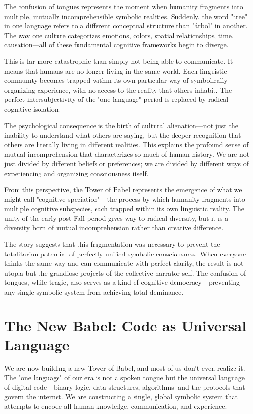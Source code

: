The confusion of tongues represents the moment when humanity fragments into multiple, mutually incomprehensible symbolic realities. Suddenly, the word "tree" in one language refers to a different conceptual structure than "árbol" in another. The way one culture categorizes emotions, colors, spatial relationships, time, causation—all of these fundamental cognitive frameworks begin to diverge.

This is far more catastrophic than simply not being able to communicate. It means that humans are no longer living in the same world. Each linguistic community becomes trapped within its own particular way of symbolically organizing experience, with no access to the reality that others inhabit. The perfect intersubjectivity of the "one language" period is replaced by radical cognitive isolation.

The psychological consequence is the birth of cultural alienation—not just the inability to understand what others are saying, but the deeper recognition that others are literally living in different realities. This explains the profound sense of mutual incomprehension that characterizes so much of human history. We are not just divided by different beliefs or preferences; we are divided by different ways of experiencing and organizing consciousness itself.

From this perspective, the Tower of Babel represents the emergence of what we might call "cognitive speciation"—the process by which humanity fragments into multiple cognitive subspecies, each trapped within its own linguistic reality. The unity of the early post-Fall period gives way to radical diversity, but it is a diversity born of mutual incomprehension rather than creative difference.

The story suggests that this fragmentation was necessary to prevent the totalitarian potential of perfectly unified symbolic consciousness. When everyone thinks the same way and can communicate with perfect clarity, the result is not utopia but the grandiose projects of the collective narrator self. The confusion of tongues, while tragic, also serves as a kind of cognitive democracy—preventing any single symbolic system from achieving total dominance.

\section{The New Babel: Code as Universal Language}

We are now building a new Tower of Babel, and most of us don't even realize it. The "one language" of our era is not a spoken tongue but the universal language of digital code—binary logic, data structures, algorithms, and the protocols that govern the internet. We are constructing a single, global symbolic system that attempts to encode all human knowledge, communication, and experience.

